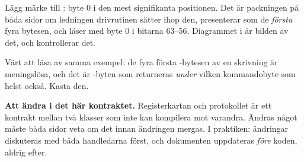 Lägg märke till : byte 0 i den mest signifikanta positionen. Det är packningen
på båda sidor om ledningen \textemdash{} drivrutinen sätter ihop den, 
presenterar  som de \emph{första} fyra bytesen, och  läser
 med byte 0 i bitarna 63--56. Diagrammet i  är bilden av
det, och  kontrollerar det.

Värt att läsa av samma exempel: de fyra första -bytesen av en skrivning är meningslösa,
och det är -byten som returneras \emph{under} vilken kommandobyte som helst också. Kasta
den.

\begin{aside}
\textbf{Att ändra i det här kontraktet.} Registerkartan och protokollet är ett kontrakt mellan två
klasser som inte kan kompilera mot varandra. Ändras något måste båda sidor veta om det innan
ändringen mergas. I praktiken: ändringar diskuteras med båda handledarna först, och dokumenten
uppdateras \emph{före} koden, aldrig efter.
\end{aside}
